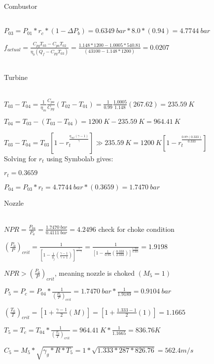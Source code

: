 \documentclass{article}
\begin{document}
	\begin{Large}
		Combustor
	\end{Large}
\\

$P_{03}=P_{01}*r_c*(1-\Delta P_b)=0.6349\ bar*8.0*(0.94)=4.7744\ bar$

$f_{actual}=\frac{C_{pg}T_{03}-C_{pa}T_{02}}{\eta_b (Q_f-C_{pg}T_{03})}=\frac{1.148*1200-1.0005*540.81}{ (43100-1.148*1200)}=0.0207$
\\
\\

	\begin{Large}
		Turbine
	\end{Large}
\\

$T_{03}-T_{04}=\frac{1}{\eta_m}\frac{C_{pa}}{C_{pg}}(T_{02}-T_{01})=\frac{1}{0.99}\frac{1.0005}{1.148}(267.62)=235.59\ K$

$T_{04}=T_{03}-(T_{03}-T_{04})=1200\ K-235.59\ K=964.41\ K$

$T_{03}-T_{04}=T_{03}[1-r_t^{\frac{\eta_{\infty t}(\gamma-1)}{\gamma}}]\gg 235.59\ 
K=1200\ K[1-r_t^{\frac{0.87(0.333)}{0.333}}]$
\\

Solving for $r_t$ using Symbolab gives:

$r_t=0.3659$

$P_{04}=P_{03}*r_t=4.7744\ bar*(0.3659)=1.7470\ bar$
\\

	\begin{Large}
		Nozzle
	\end{Large}
\\

$NPR=\frac{P_{04}}{P_a}=\frac{1.7470\ bar}{0.4111\ bar}=4.2496$
check for choke condition

$(\frac{P_0}{P})_{crit}=\frac{1}{[1-\frac{1}{\eta_j}(\frac{\gamma-1}{\gamma+1})]^{\frac{\gamma}{\gamma-1}}}
=\frac{1}{[1-\frac{1}{0.95}(\frac{0.333}{2.333})]^{\frac{1.333}{0.333}}}=1.9198$

$NPR>(\frac{P_0}{P})_{crit}$, meaning nozzle is choked $(M_5=1)$

$P_5=P_c=P_{04}*\frac{1}{(\frac{P_0}{P})_{crit}}=1.7470\ bar*\frac{1}{1.9189}=0.9104\ bar$

$(\frac{T_0}{T})_{crit}=[1+\frac{\gamma-1}{2}(M)]=[1+\frac{1.333-1}{2}(1)]=1.1665$

$T_5=T_c=T_{04}*\frac{1}{(\frac{T_0}{T})_{crit}}=964.41\ K*\frac{1}{1.1665}=836.76K$

$C_5=M_5*\sqrt{\gamma_g*R*T_5}=1*\sqrt{1.333*287*826.76}=562.4 m/s$
\end{document}
